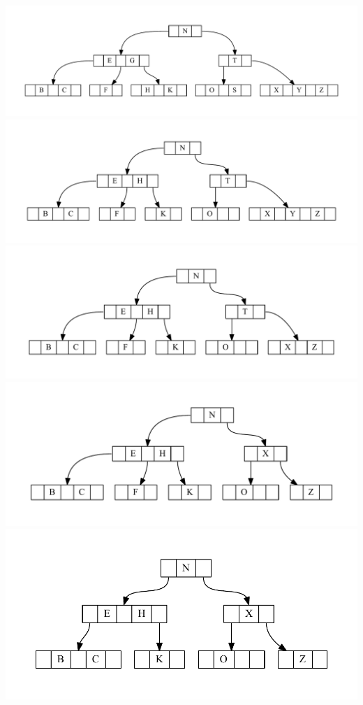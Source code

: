\documentclass[11pt]{article}
\begin{document}
	\\
		\includegraphics[scale=.5]{bstep1.pdf}\\
		\includegraphics[scale=.5]{bstep2.pdf}\\
		\includegraphics[scale=.5]{bstep3.pdf}\\
		\includegraphics[scale=.5]{bstep4.pdf}\\
		\includegraphics[scale=.5]{bstep5.pdf}\\
		
\end{document}
